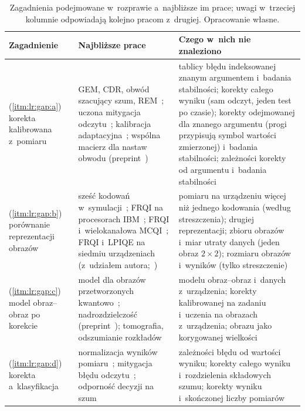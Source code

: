 \begin{table}[tb]
\centering
\caption[Zagadnienia podejmowane w~rozprawie a~najbliższe im prace]{Zagadnienia podejmowane w~rozprawie a~najbliższe im prace; uwagi w~trzeciej kolumnie odpowiadają kolejno pracom z~drugiej. Opracowanie własne.}
\label{tab:lr:gap}
\footnotesize
\setlength{\tabcolsep}{3pt}
\newcommand{\lrc}[1]{\raggedright\hspace{0pt}#1}
\begin{tabular}{@{}p{2.35cm}p{5.9cm}p{7.2cm}@{}}
\toprule
\lrc{\textbf{Zagadnienie}} & \lrc{\textbf{Najbliższe prace}} & \lrc{\textbf{Czego w~nich nie znaleziono}} \tabularnewline
\midrule
\lrc{(\ref{itm:lr:gap:a}) korekta kalibrowana z~pomiaru} & \lrc{GEM, CDR, obwód szacujący szum, REM~\cite{jattana_general_2020,czarnik_error_2021,urbanek_mitigating_2021,lolur_reference-state_2023}; uczona mitygacja odczytu~\cite{kim_quantum_2022}; kalibracja adaptacyjna~\cite{balewski_quantum-parallel_2024}; wspólna macierz dla nastaw obwodu (preprint~\cite{shen_circuit_2025})} & \lrc{tablicy błędu indeksowanej znanym argumentem i~badania stabilności; korekty całego wyniku (sam odczyt, jeden test po czasie); korekty odejmowanej dla znanego argumentu (progi przypisują symbol wartości zmierzonej) i~badania stabilności; zależności korekty od argumentu i~badania stabilności} \tabularnewline\addlinespace[2pt]
\lrc{(\ref{itm:lr:gap:b}) porównanie reprezentacji obrazów} & \lrc{sześć kodowań w~symulacji~\cite{martinez-guerrero_quantum_2026}; FRQI na procesorach IBM~\cite{geng_improved_2023}; FRQI i~wielokanałowa MCQI~\cite{mastriani_analysis_2021}; FRQI i~LPIQE na siedmiu urządzeniach (z~udziałem autora;~\cite{kordasz_image_encoding_2025})} & \lrc{pomiaru na urządzeniu więcej niż jednego kodowania (według streszczenia); drugiej reprezentacji; zbioru obrazów i~miar utraty danych (jeden obraz $2\times2$); rozmiaru obrazów i~wyników (tylko streszczenie)} \tabularnewline\addlinespace[2pt]
\lrc{(\ref{itm:lr:gap:c}) model obraz--obraz po korekcie} & \lrc{model dla obrazów przetworzonych kwantowo~\cite{zhou_quantum_2024}; nadrozdzielczość (preprint~\cite{jadhav_image_2026}); tomografia, odszumianie rozkładów~\cite{ahmed_quantum_2021,lin_quantum_2025}} & \lrc{modelu obraz--obraz i~danych z~urządzenia; korekty kalibrowanej na zadaniu i~uczenia na obrazach z~urządzenia; obrazu jako korygowanej wielkości} \tabularnewline\addlinespace[2pt]
\lrc{(\ref{itm:lr:gap:d}) korekta a~klasyfikacja} & \lrc{normalizacja wyników pomiaru~\cite{wang_quantumnat_2022}; mitygacja błędu odczytu~\cite{peters_machine_2021,singh_benchmarking_2026}; odporność decyzji na szum~\cite{larose_robust_2020}} & \lrc{zależności błędu od wartości wyniku; korekty całego wyniku i~rozdzielenia składowych szumu; korekty wyniku i~skończonej liczby pomiarów} \tabularnewline
\bottomrule
\end{tabular}
\end{table}
